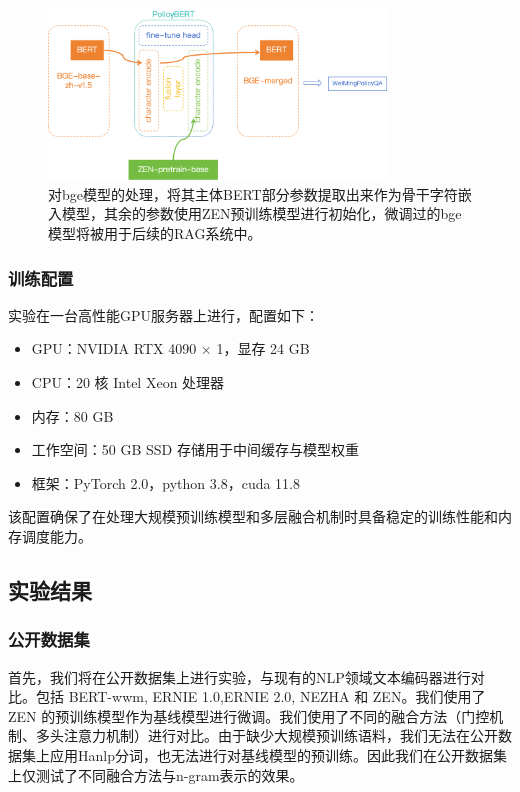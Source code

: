 \documentclass[12pt, a4paper]{ctexart}
\begin{document}
\begin{figure}[H]
    \centering
    \includegraphics[width=0.8\textwidth]{images/model_merge.png}
    \caption{对bge模型的处理，将其主体BERT部分参数提取出来作为骨干字符嵌入模型，其余的参数使用ZEN预训练模型进行初始化，微调过的bge模型将被用于后续的RAG系统中。}
    \label{fig:model_merge}
\end{figure}


\subsubsection{训练配置}
实验在一台高性能GPU服务器上进行，配置如下：

\begin{itemize}
    \item GPU：NVIDIA RTX 4090 × 1，显存 24 GB
    \item CPU：20 核 Intel Xeon 处理器
    \item 内存：80 GB
    \item 工作空间：50 GB SSD 存储用于中间缓存与模型权重
    \item 框架：PyTorch 2.0，python 3.8，cuda 11.8
\end{itemize}

该配置确保了在处理大规模预训练模型和多层融合机制时具备稳定的训练性能和内存调度能力。

\subsection{实验结果}
\subsubsection{公开数据集}
首先，我们将在公开数据集上进行实验，与现有的NLP领域文本编码器进行对比。包括 BERT-wwm\cite{Cui_2021}, ERNIE 1.0\cite{sun2019ernieenhancedrepresentationknowledge},ERNIE 2.0\cite{sun2019ernie20continualpretraining}, NEZHA\cite{wei2021nezhaneuralcontextualizedrepresentation} 和 ZEN\cite{diao-etal-2020-zen}。我们使用了 ZEN 的预训练模型作为基线模型进行微调。我们使用了不同的融合方法（门控机制、多头注意力机制）进行对比。由于缺少大规模预训练语料，我们无法在公开数据集上应用Hanlp分词，也无法进行对基线模型的预训练。因此我们在公开数据集上仅测试了不同融合方法与n-gram表示的效果。
\end{document}
